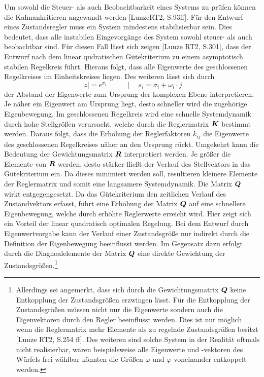 Um sowohl die Steuer- als auch Beobachtbarkeit eines Systems zu prüfen können die Kalmankritieren angewandt werden [LunzeRT2, S.93ff]. Für den Entwurf eines Zustandsregler muss ein System mindestens stabilisierbar sein. Dies bedeutet, dass alle instabilen Eingevorgänge des System sowohl steuer- als auch beobachtbar sind. Für diesen Fall lässt sich zeigen [Lunze RT2, S.301], dass der Entwurf nach dem linear qudratischen Gütekriterium zu einem asymptotisch stabilen Regelkreis führt. Hieraus folgt, dass alle Eigenwerte des geschlossenen Regelkreises im Einheitskreises liegen. Des weiteren lässt sich durch
\begin{equation}
\vert z\vert = e^{\sigma_i} \hspace{35pt} \vert \hspace{15pt} s_i = \sigma_i + \omega_i\cdot j
\end{equation}
der Abstand der Eigenwerte zum Ursprung der komplexen Ebene interpretieren. Je näher ein Eigenwert am Ursprung liegt, desto schneller wird die zugehörige Eigenbewegung. Im geschlossenen Regelkreis wird eine schnelle Systemdynamik durch hohe Stellgrößen verursacht, welche durch die Reglermatrix $\boldsymbol{K}$ bestimmt werden. Daraus folgt, dass die Erhöhung der Reglerfaktoren $k_{ij}$ die Eigenwerte des geschlossenen Regelkreises näher an den Ursprung rückt. Umgekehrt kann die Bedeutung der Gewichtungsmatrix $\boldsymbol{R}$ interpretiert werden. Je größer die Elemente von $\boldsymbol{R}$ werden, desto stärker fließt der Verlauf des Stellvektors in das Gütekriterium ein. Da dieses minimiert werden soll, resultieren kleinere Elemente der Reglermatrix und somit eine langsamere Systemdynamik.
Die Matrix $\boldsymbol{Q}$ wirkt entgegengesetzt. Da das Gütekriterium den zeitlichen Verlauf des Zustandvektors erfasst, führt eine Erhöhung der Matrix $\boldsymbol{Q}$ auf eine schnellere Eigenbewegung, welche durch erhöhte Reglerwerte erreicht wird. Hier zeigt sich ein Vorteil der linear quadratisch optimalen Regelung. Bei dem Entwurf durch Eigenwertvorgabe kann der Verlauf einer Zustandsgröße nur indirekt durch die Definition der Eigenbewegung beeinflusst werden. Im Gegensatz dazu erfolgt durch die Diagnoalelemente der Matrix $\boldsymbol{Q}$ eine direkte Gewichtung der Zustandsgrößen.\footnote{Allerdings sei angemerkt, dass sich durch die Gewichtungsmatrix $\boldsymbol{Q}$ keine Entkopplung der Zustandsgrößen erzwingen lässt. Für die Entkopplung der Zustandsgrößen müssen nicht nur die Eigenwerte sondern auch die Eigenvektoren durch den Regler beeinflusst werden. Dies ist nur möglich wenn die Reglermatrix mehr Elemente als zu regelnde Zustandsgrößen besitzt [Lunze RT2, S.254 ff]. Des weiteren sind solche System in der Realität oftmals nicht realisierbar, wären beispielsweise alle Eigenwerte und -vektoren des Würfels frei wählbar könnten die Größen $\varphi$ und $\dot{\varphi}$ voneinander entkoppelt werden.}
